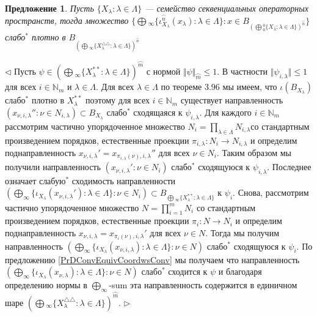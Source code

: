 \documentclass[12pt]{article}
\newtheorem{proposition}[theorem]{Предложение}
\newenvironment{proof}{\par $\triangleleft$}{$\triangleright$}
\begin{document}
\begin{proposition}\label{PrDensSubsetOfSumOfDoubleDuals} Пусть $\{X_\lambda:\lambda\in\Lambda\}$ --- семейство секвенциальных операторных пространств, тогда множество $\{\bigoplus{}_\infty\{\iota_{X_\lambda}^{\wideparen{n}}(x_\lambda):\lambda\in \Lambda\}:x\in B_{(\bigoplus{}_0^0\{X_\lambda:\lambda\in \Lambda\})^{\wideparen{n}}}\}$ слабо${}^*$ плотно в  $B_{(\bigoplus{}_\infty\{X_\lambda^{\triangle\triangle}:\lambda\in \Lambda\})^{\wideparen{n}}}$
\end{proposition}
\begin{proof}
Пусть $\psi\in (\bigoplus{}_\infty\{X_\lambda^{**}:\lambda\in \Lambda\})^{\wideparen{m}}$ с нормой $\Vert\psi\Vert_{\wideparen{m}}\leq 1$. В частности $\Vert\psi_{i,\lambda}\Vert\leq 1$ для всех $i\in\mathbb{N}_m$ и $\lambda\in\Lambda$. Для всех $\lambda\in\Lambda$ по теореме 3.96 \cite{FabZizBanSpTh} мы имеем, что $\iota(B_{X_\lambda})$ слабо${}^*$ плотно в $X_\lambda^{**}$ поэтому для всех $i\in\mathbb{N}_m$ существует направленность $(x_{\nu,i,\lambda}'':\nu\in N_{i,\lambda})\subset B_{X_\lambda}$ слабо${}^*$ сходящаяся к $\psi_{i,\lambda}$. Для каждого $i\in\mathbb{N}_m$ рассмотрим частично упорядоченное множество $N_i=\prod_{\lambda\in\Lambda}N_{i,\lambda}$со стандартным произведением порядков, естественные проекции $\pi_{i,\lambda}:N_i\to N_{i,\lambda}$ и определим поднаправленность $x_{\nu,i,\lambda}'=x_{\pi_{i,\lambda}(\nu),i,\lambda}''$ для всех $\nu\in N_i$. Таким образом мы получили направленность $(x_{\nu,i,\lambda}':\nu\in N_i)$ слабо${}^*$ сходящуюся к $\psi_{i,\lambda}$. Последнее означает слабую${}^*$ сходимость направленности $(\bigoplus_\infty\{\iota_{X_\lambda}(x_{\nu,i,\lambda}'):\lambda\in\Lambda\}:\nu\in N_i)\subset B_{\bigoplus{}_\infty\{X_\lambda^{**}:\lambda\in \Lambda\}}$ к $\psi_i$. Снова, рассмотрим частично упорядоченное множество $N=\prod_{i=1}^m N_i$ со стандартным произведением порядков, естественные проекции $\pi_i:N\to N_i$ и определим поднаправленность $x_{\nu,i,\lambda}=x_{\pi_i(\nu),i,\lambda}'$ для всех $\nu\in N$. Тогда мы получим направленность $(\bigoplus_\infty\{\iota_{X_\lambda}(x_{\nu,i,\lambda}):\lambda\in\Lambda\}:\nu\in N)$ слабо${}^*$ сходящуюся к $\psi_i$. По предложению \ref{PrDConvEquivCoordwsConv} мы получаем что направленность $(\bigoplus_\infty\{\iota_{X_\lambda}(x_{\nu,\lambda}):\lambda\in\Lambda\}:\nu\in N)$ слабо${}^*$ сходится к $\psi$ и благодаря определению нормы в $\bigoplus_\infty$-sum эта направленность содержится в единичном шаре $(\bigoplus{}_\infty\{X_\lambda^{\triangle\triangle}:\lambda\in \Lambda\})^{\wideparen{m}}$. 
\end{proof}
\end{document}
